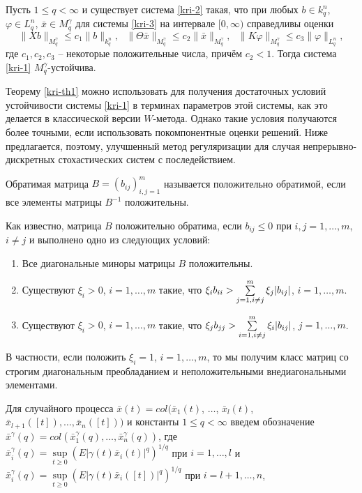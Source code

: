 \begin{theorem}\label{kri-th1}Пусть $1\le q < \infty $ и существует
система \eqref{kri-2} такая, что при любых $b \in k^n_q$, $\varphi \in L^n_q$,
$\bar x \in M_q^\gamma $ для системы \eqref{kri-3} на интервале $[0, \infty)$
справедливы оценки
$$
\| Xb\|_{M_q^\gamma} \le c_1\|b\|_{k_q^n}, \ \ \ \|\Theta \bar
x\|_{M_q^\gamma} \le c_2\|\bar x\|_{M_q^\gamma}, \ \ \  \|K\varphi
\|_{M_q^\gamma} \le c_3  \|\varphi \|_{L^n_q},
$$
где $c_1, c_2, c_3$ -- некоторые положительные числа, причём $c_2 <
1$. Тогда система \eqref{kri-1} $M_q^\gamma$-устойчива.
\end{theorem}

Теорему \ref{kri-th1} можно использовать для получения достаточных условий
устойчивости системы \eqref{kri-1} в терминах параметров этой системы, как это
делается в классической версии $W$-метода. Однако такие условия
получаются более точными, если использовать покомпонентные оценки
решений. Ниже предлагается, поэтому, улучшенный метод регуляризации
для случая непрерывно-дискретных стохастических систем с
последействием.

\begin{definition}\label{kri-def4} Обратимая матрица $B = (b_{ij})^m_{i,j=1}$
называется положительно обратимой, если все элементы матрицы
$B^{-1}$ положительны.
\end{definition}

Как известно, матрица $B$ положительно обратима, если $b_{ij} \leq
0$ при $i, j = 1,\dots,m$, $i\neq j$ и выполнено одно из следующих
условий:
\begin{enumerate}
  \item  Все диагональные миноры матрицы $B$ положительны.
  \item Существуют
$\xi _i>0$, $i = 1,\dots,m$ такие, что $\xi_i b_{ii} > \sum \limits
_{j=1\\, i \neq j}^m\xi_j |b_{ij}|$, $i = 1,\dots,m$.
  \item Существуют
$\xi _i>0$, $i = 1,\dots,m$ такие, что $\xi_j b_{jj} > \sum \limits
_{i=1\\, i \neq j}^m\xi_i |b_{ij}|$, $j = 1,\dots,m$.
\end{enumerate}

В частности, если положить $\xi _i = 1$, $i = 1,\dots,m$, то мы
получим класс матриц со строгим диагональным преобладанием и
неположительными внедиагональными элементами.

Для случайного процесса $\bar x(t) = col(\bar x_1(t)$, $\dots$, $\bar
x_l(t)$, $\bar x_{l+1}([t]),\dots,\bar x_n([t]))$ и константы $1 \leq q
< \infty $ введем обозначение $ \bar x^\gamma (q) = col (\bar
x_1^\gamma (q),\dots,\bar x_n^\gamma (q))$, где \\$\bar x_i^\gamma (q) =
\sup \limits _{t \geq 0}\left(E|\gamma (t) \bar x_i(t)|^{q}\right)^{1/q}$ при   $i = 1,\dots,l$ и $\bar x_i^\gamma (q) = \sup \limits
_{t \geq 0}\left(E|\gamma (t)\bar x_i([t])|^{q}\right)^{1/q}$ при
$i = l+1,\dots,n$,

